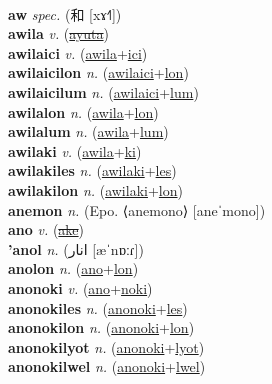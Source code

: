  \label{alkun} \\
\textbf{aw} \textit{spec.} ({\chinese{}和} [xɤ˧˥])
 \label{aw} \\
\textbf{awila} \textit{v.} (\hyperref[ayuta]{\sout{ayuta}})
 \label{awila} \\
\textbf{awilaici} \textit{v.} (\hyperref[awila]{awila}+\hyperref[ici]{ici})
 \label{awilaici} \\
\textbf{awilaicilon} \textit{n.} (\hyperref[awilaici]{awilaici}+\hyperref[lon]{lon})
 \label{awilaicilon} \\
\textbf{awilaicilum} \textit{n.} (\hyperref[awilaici]{awilaici}+\hyperref[lum]{lum})
 \label{awilaicilum} \\
\textbf{awilalon} \textit{n.} (\hyperref[awila]{awila}+\hyperref[lon]{lon})
 \label{awilalon} \\
\textbf{awilalum} \textit{n.} (\hyperref[awila]{awila}+\hyperref[lum]{lum})
 \label{awilalum} \\
\textbf{awilaki} \textit{v.} (\hyperref[awila]{awila}+\hyperref[ki]{ki})
 \label{awilaki} \\
\textbf{awilakiles} \textit{n.} (\hyperref[awilaki]{awilaki}+\hyperref[les]{les})
 \label{awilakiles} \\
\textbf{awilakilon} \textit{n.} (\hyperref[awilaki]{awilaki}+\hyperref[lon]{lon})
 \label{awilakilon} \\
\textbf{anemon} \textit{n.} (Epo. ⟨anemono⟩ [aneˈmono])
 \label{anemon} \\
\textbf{ano} \textit{v.} (\hyperref[ake]{\sout{ake}})
 \label{ano} \\
\textbf{'anol} \textit{n.} ({\arabics{}انار} [æˈnɒːɾ])
 \label{'anol} \\
\textbf{anolon} \textit{n.} (\hyperref[ano]{ano}+\hyperref[lon]{lon})
 \label{anolon} \\
\textbf{anonoki} \textit{v.} (\hyperref[ano]{ano}+\hyperref[noki]{noki})
 \label{anonoki} \\
\textbf{anonokiles} \textit{n.} (\hyperref[anonoki]{anonoki}+\hyperref[les]{les})
 \label{anonokiles} \\
\textbf{anonokilon} \textit{n.} (\hyperref[anonoki]{anonoki}+\hyperref[lon]{lon})
 \label{anonokilon} \\
\textbf{anonokilyot} \textit{n.} (\hyperref[anonoki]{anonoki}+\hyperref[lyot]{lyot})
 \label{anonokilyot} \\
\textbf{anonokilwel} \textit{n.} (\hyperref[anonoki]{anonoki}+\hyperref[lwel]{lwel})
 \label{anonokilwel} \\
